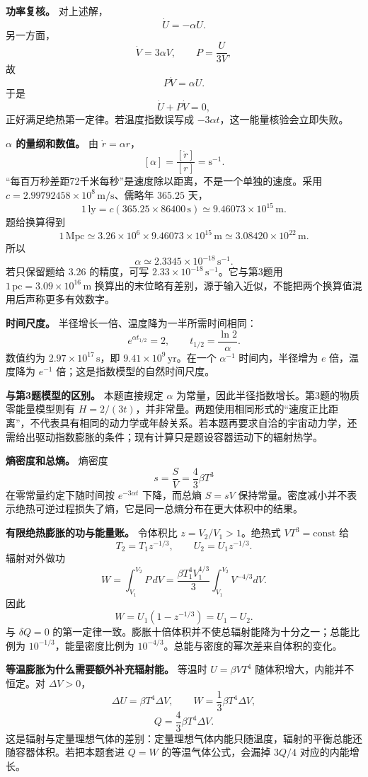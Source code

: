 \documentclass[12pt,a4paper,UTF8]{ctexart}
\begin{document}
\textbf{功率复核。} 对上述解， \[
\dot U=-\alpha U.
\] 另一方面， \[
\dot V=3\alpha V,\qquad P=\frac{U}{3V},
\] 故 \[
P\dot V=\alpha U.
\] 于是 \[
\dot U+P\dot V=0,
\] 正好满足绝热第一定律。若温度指数误写成
\(-3\alpha t\)，这一能量核验会立即失败。

\textbf{\(\alpha\) 的量纲和数值。} 由 \(\dot r=\alpha r\)， \[
[\alpha]=\frac{[\dot r]}{[r]}=\mathrm{s^{-1}}.
\] ``每百万秒差距72千米每秒''是速度除以距离，不是一个单独的速度。采用
\(c=2.99792458\times10^8\,\mathrm{m/s}\)、儒略年 \(365.25\) 天， \[
1\,\mathrm{ly}=c(365.25\times86400\,\mathrm s)
\simeq9.46073\times10^{15}\,\mathrm m.
\] 题给换算得到 \[
1\,\mathrm{Mpc}\simeq
3.26\times10^6\times9.46073\times10^{15}\,\mathrm m
\simeq3.08420\times10^{22}\,\mathrm m.
\] 所以 \[
\boxed{\alpha\simeq2.3345\times10^{-18}\,\mathrm{s^{-1}}}.
\] 若只保留题给 \(3.26\) 的精度，可写
\(2.33\times10^{-18}\,\mathrm{s^{-1}}\)。它与第3题用
\(1\,\mathrm{pc}=3.09\times10^{16}\,\mathrm m\)
换算出的末位略有差别，源于输入近似，不能把两个换算值混用后声称更多有效数字。

\textbf{时间尺度。} 半径增长一倍、温度降为一半所需时间相同： \[
e^{\alpha t_{1/2}}=2,
\qquad
\boxed{t_{1/2}=\frac{\ln2}{\alpha}}.
\] 数值约为 \(2.97\times10^{17}\,\mathrm s\)，即
\(9.41\times10^9\,\mathrm{yr}\)。在一个 \(\alpha^{-1}\) 时间内，半径增为
\(e\) 倍，温度降为 \(e^{-1}\) 倍；这是指数模型的自然时间尺度。

\textbf{与第3题模型的区别。} 本题直接规定 \(\alpha\)
为常量，因此半径指数增长。第3题的物质零能量模型则有
\(H=2/(3t)\)，并非常量。两题使用相同形式的``速度正比距离''，不代表具有相同的动力学或年龄关系。若本题再要求自洽的宇宙动力学，还需给出驱动指数膨胀的条件；现有计算只是题设容器运动下的辐射热学。

\textbf{熵密度和总熵。} 熵密度 \[
s=\frac SV=\frac43\beta T^3
\] 在零常量约定下随时间按 \(e^{-3\alpha t}\) 下降，而总熵 \(S=sV\)
保持常量。密度减小并不表示绝热可逆过程损失了熵，它是同一总熵分布在更大体积中的结果。

\textbf{有限绝热膨胀的功与能量账。} 令体积比 \(z=V_2/V_1>1\)。绝热式
\(VT^3=\mathrm{const}\) 给 \[
T_2=T_1z^{-1/3},\qquad
U_2=U_1z^{-1/3}.
\] 辐射对外做功 \[
W=\int_{V_1}^{V_2}P\,dV
=\frac{\beta T_1^4V_1^{4/3}}3
\int_{V_1}^{V_2}V^{-4/3}dV.
\] 因此 \[
\boxed{W=U_1(1-z^{-1/3})=U_1-U_2}.
\] 与 \(\delta Q=0\)
的第一定律一致。膨胀十倍体积并不使总辐射能降为十分之一；总能比例为
\(10^{-1/3}\)，能量密度比例为
\(10^{-4/3}\)。总能与密度的幂次差来自体积的变化。

\textbf{等温膨胀为什么需要额外补充辐射能。} 等温时 \(U=\beta VT^4\)
随体积增大，内能并不恒定。对 \(\Delta V>0\)， \[
\Delta U=\beta T^4\Delta V,\qquad
W=\frac13\beta T^4\Delta V,
\] \[
Q=\frac43\beta T^4\Delta V.
\]
这是辐射与定量理想气体的差别：定量理想气体内能只随温度，辐射的平衡总能还随容器体积。若把本题套进
\(Q=W\) 的等温气体公式，会漏掉 \(3Q/4\) 对应的内能增长。
\end{document}
